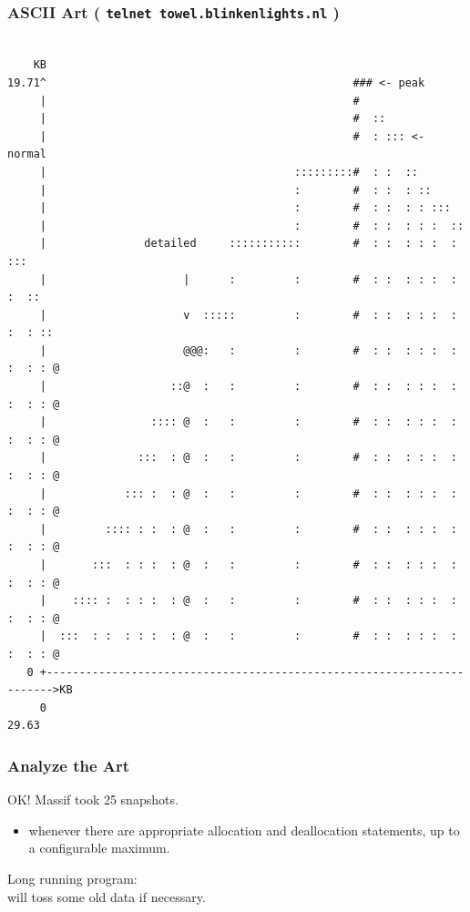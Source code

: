 \begin{frame}[fragile]
\frametitle{ASCII Art ( \texttt{telnet towel.blinkenlights.nl} )}

{\scriptsize
\begin{verbatim}

    KB
19.71^                                               ### <- peak                
     |                                               #                        
     |                                               #  ::                    
     |                                               #  : ::: <- normal         
     |                                      :::::::::#  : :  ::               
     |                                      :        #  : :  : ::             
     |                                      :        #  : :  : : :::          
     |                                      :        #  : :  : : :  ::        
     |               detailed     :::::::::::        #  : :  : : :  : :::     
     |                     |      :         :        #  : :  : : :  : :  ::   
     |                     v  :::::         :        #  : :  : : :  : :  : :: 
     |                     @@@:   :         :        #  : :  : : :  : :  : : @
     |                   ::@  :   :         :        #  : :  : : :  : :  : : @
     |                :::: @  :   :         :        #  : :  : : :  : :  : : @
     |              :::  : @  :   :         :        #  : :  : : :  : :  : : @
     |            ::: :  : @  :   :         :        #  : :  : : :  : :  : : @
     |         :::: : :  : @  :   :         :        #  : :  : : :  : :  : : @
     |       :::  : : :  : @  :   :         :        #  : :  : : :  : :  : : @
     |    :::: :  : : :  : @  :   :         :        #  : :  : : :  : :  : : @
     |  :::  : :  : : :  : @  :   :         :        #  : :  : : :  : :  : : @
   0 +----------------------------------------------------------------------->KB
     0                                                                   29.63

\end{verbatim}
}

\end{frame}



\begin{frame}
\frametitle{Analyze the Art}

\Large
\begin{changemargin}{2cm}
OK! Massif took 25 snapshots.

\begin{itemize}
\item whenever there are appropriate allocation and deallocation statements, up to a configurable maximum. 
\end{itemize}

Long running program:\\ will toss some old data if necessary. 
\end{changemargin}
\end{frame}



